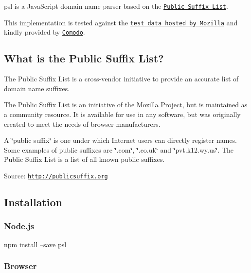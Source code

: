 \href{https://nodei.co/npm/psl/}{\tt }

\href{https://greenkeeper.io/}{\tt } \href{https://travis-ci.org/wrangr/psl}{\tt } \href{https://david-dm.org/wrangr/psl#info=devDependencies}{\tt }

{\ttfamily psl} is a {\ttfamily Java\+Script} domain name parser based on the \href{https://publicsuffix.org/}{\tt Public Suffix List}.

This implementation is tested against the \href{http://mxr.mozilla.org/mozilla-central/source/netwerk/test/unit/data/test_psl.txt?raw=1}{\tt test data hosted by Mozilla} and kindly provided by \href{https://www.comodo.com/}{\tt Comodo}.

\subsection*{What is the Public Suffix List?}

The Public Suffix List is a cross-\/vendor initiative to provide an accurate list of domain name suffixes.

The Public Suffix List is an initiative of the Mozilla Project, but is maintained as a community resource. It is available for use in any software, but was originally created to meet the needs of browser manufacturers.

A \char`\"{}public suffix\char`\"{} is one under which Internet users can directly register names. Some examples of public suffixes are \char`\"{}.\+com\char`\"{}, \char`\"{}.\+co.\+uk\char`\"{} and \char`\"{}pvt.\+k12.\+wy.\+us\char`\"{}. The Public Suffix List is a list of all known public suffixes.

Source\+: \href{http://publicsuffix.org}{\tt http\+://publicsuffix.\+org}

\subsection*{Installation}

\subsubsection*{Node.\+js}


\begin{DoxyCode}
npm install --save psl
\end{DoxyCode}


\subsubsection*{Browser}


